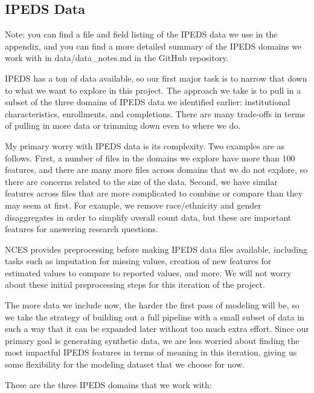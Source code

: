 \documentclass[sigconf, authorversion, nonacm]{acmart}
\begin{document}
    \subsection{IPEDS Data}
        Note: you can find a file and field listing of the IPEDS data we use in the appendix, and you can find a more detailed summary of the IPEDS domains we work with in data/data\_notes.md in the GitHub repository.

        IPEDS has a ton of data available, so our first major task is to narrow that down to what we want to explore in this project. The approach we take is to pull in a subset of the three domains of IPEDS data we identified earlier: institutional characteristics, enrollments, and completions. There are many trade-offs in terms of pulling in more data or trimming down even to where we do.

        My primary worry with IPEDS data is its complexity. Two examples are as follows. First, a number of files in the domains we explore have more than 100 features, and there are many more files across domains that we do not explore, so there are concerns related to the size of the data. Second, we have similar features across files that are more complicated to combine or compare than they may seem at first. For example, we remove race/ethnicity and gender disaggregates in order to simplify overall count data, but these are important features for answering research questions.

        NCES provides preprocessing before making IPEDS data files available, including tasks such as imputation for missing values, creation of new features for estimated values to compare to reported values, and more. We will not worry about these initial preprocessing steps for this iteration of the project.

        The more data we include now, the harder the first pass of modeling will be, so we take the strategy of building out a full pipeline with a small subset of data in such a way that it can be expanded later without too much extra effort. Since our primary goal is generating synthetic data, we are less worried about finding the most impactful IPEDS features in terms of meaning in this iteration, giving us some flexibility for the modeling dataset that we choose for now.

        These are the three IPEDS domains that we work with:
\end{document}
